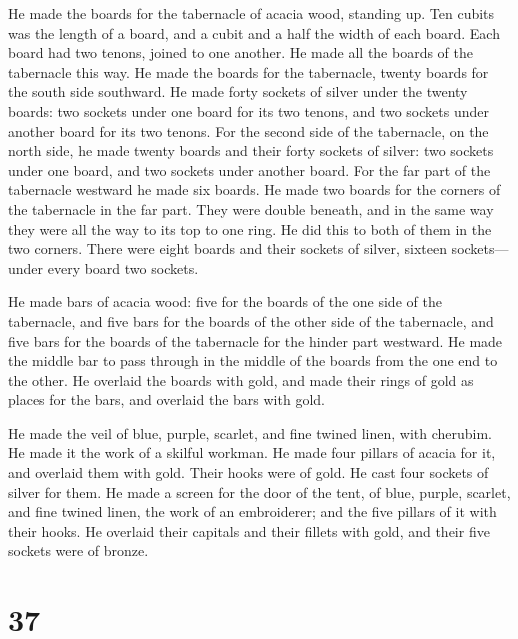  He made the boards for the tabernacle of acacia wood,
standing up.  Ten cubits was the length of a board, and a
cubit and a half the width of each board.  Each board had
two tenons, joined to one another. He made all the boards of the
tabernacle this way.  He made the boards for the
tabernacle, twenty boards for the south side southward.  He
made forty sockets of silver under the twenty boards: two sockets under
one board for its two tenons, and two sockets under another board for
its two tenons.  For the second side of the tabernacle, on
the north side, he made twenty boards  and their forty
sockets of silver: two sockets under one board, and two sockets under
another board.  For the far part of the tabernacle westward
he made six boards.  He made two boards for the corners of
the tabernacle in the far part.  They were double beneath,
and in the same way they were all the way to its top to one ring. He did
this to both of them in the two corners.  There were eight
boards and their sockets of silver, sixteen sockets---under every board
two sockets.

 He made bars of acacia wood: five for the boards of the
one side of the tabernacle,  and five bars for the boards
of the other side of the tabernacle, and five bars for the boards of the
tabernacle for the hinder part westward.  He made the
middle bar to pass through in the middle of the boards from the one end
to the other.  He overlaid the boards with gold, and made
their rings of gold as places for the bars, and overlaid the bars with
gold.

 He made the veil of blue, purple, scarlet, and fine twined
linen, with cherubim. He made it the work of a skilful workman.
 He made four pillars of acacia for it, and overlaid them
with gold. Their hooks were of gold. He cast four sockets of silver for
them.  He made a screen for the door of the tent, of blue,
purple, scarlet, and fine twined linen, the work of an embroiderer;
 and the five pillars of it with their hooks. He overlaid
their capitals and their fillets with gold, and their five sockets were
of bronze.

\hypertarget{section-36}{%
\section{37}\label{section-36}}

